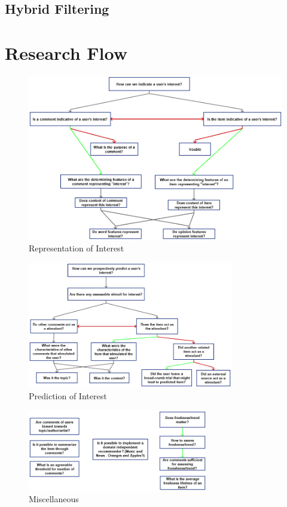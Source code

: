 \subsection{Hybrid Filtering}

\newpage
\section{Research Flow}
\begin{figure}[!h]
\centering
\includegraphics[width=1\textwidth]{c-1_images/r_questions_rep.png}
\caption{Representation of Interest}
\label{fig:r_questions_rep}
\end{figure}

\begin{figure}[!h]
\centering
\includegraphics[width=0.8\textwidth]{c-1_images/r_questions_pred.png}
\caption{Prediction of Interest}
\label{fig:r_questions_pred}
\end{figure}

\begin{figure}[!h]
\centering
\includegraphics[width=0.7\textwidth]{c-1_images/r_questions_misc.png}
\caption{Miscellaneous}
\label{fig:r_questions_misc}
\end{figure}